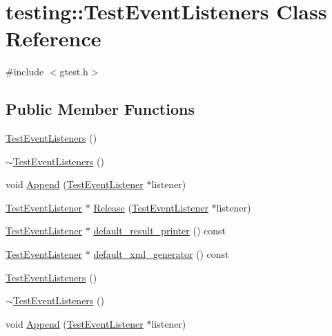 \hypertarget{classtesting_1_1_test_event_listeners}{\section{testing\-:\-:Test\-Event\-Listeners Class Reference}
\label{classtesting_1_1_test_event_listeners}
}


{\ttfamily \#include $<$gtest.\-h$>$}

\subsection*{Public Member Functions}
\begin{DoxyCompactItemize}
\item 
\hyperlink{classtesting_1_1_test_event_listeners_af0716e4067a6f357ee5ea18802a591dd}{Test\-Event\-Listeners} ()
\item 
\hyperlink{classtesting_1_1_test_event_listeners_abe9fbbbedf7f55fa898abfae60aa4913}{$\sim$\-Test\-Event\-Listeners} ()
\item 
void \hyperlink{classtesting_1_1_test_event_listeners_a1207dce74d64c1c39ffa6105560536a0}{Append} (\hyperlink{classtesting_1_1_test_event_listener}{Test\-Event\-Listener} $\ast$listener)
\item 
\hyperlink{classtesting_1_1_test_event_listener}{Test\-Event\-Listener} $\ast$ \hyperlink{classtesting_1_1_test_event_listeners_a038c9fa1975f84d6f3d25b52bc7bccdd}{Release} (\hyperlink{classtesting_1_1_test_event_listener}{Test\-Event\-Listener} $\ast$listener)
\item 
\hyperlink{classtesting_1_1_test_event_listener}{Test\-Event\-Listener} $\ast$ \hyperlink{classtesting_1_1_test_event_listeners_a0a69b6a19e27d53d9ef4683c05e9f75a}{default\-\_\-result\-\_\-printer} () const 
\item 
\hyperlink{classtesting_1_1_test_event_listener}{Test\-Event\-Listener} $\ast$ \hyperlink{classtesting_1_1_test_event_listeners_a9867c9af50e8d2934a2475286c7cebc5}{default\-\_\-xml\-\_\-generator} () const 
\item 
\hyperlink{classtesting_1_1_test_event_listeners_af0716e4067a6f357ee5ea18802a591dd}{Test\-Event\-Listeners} ()
\item 
\hyperlink{classtesting_1_1_test_event_listeners_abe9fbbbedf7f55fa898abfae60aa4913}{$\sim$\-Test\-Event\-Listeners} ()
\item 
void \hyperlink{classtesting_1_1_test_event_listeners_a1207dce74d64c1c39ffa6105560536a0}{Append} (\hyperlink{classtesting_1_1_test_event_listener}{Test\-Event\-Listener} $\ast$listener)

\end{DoxyCompactItemize}
